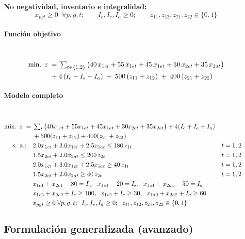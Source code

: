 \textbf{No negatividad, inventario e integralidad:}
\begin{equation}
    x_{pgt} \geq 0 \;\; \forall p,g,t; \qquad I_c, I_e, I_a \geq 0; \qquad z_{11}, z_{12}, z_{21}, z_{22} \in \{0,1\}
\end{equation}

\paragraph{Función objetivo}\mbox{}\\
\begin{align}
\mbox{min. } z \;=\;
& \textstyle\sum_{t\in\{1,2\}} \big(40\,x_{1ct} + 55\,x_{1et} + 45\,x_{1at} + 30\,x_{2ct} + 35\,x_{2at}\big) \notag\\
+\;& 4\,(I_c + I_e + I_a) \;+\; 500\,(z_{11} + z_{12}) \;+\; 400\,(z_{21} + z_{22})
\end{align}

\paragraph{Modelo completo}\mbox{}\\
\begin{align}
\mbox{min. } z \;=\;
& \textstyle\sum_{t}\big(40 x_{1ct} + 55 x_{1et} + 45 x_{1at} + 30 x_{2ct} + 35 x_{2at}\big) + 4(I_c + I_e + I_a) \notag\\
& + 500(z_{11}+z_{12}) + 400(z_{21}+z_{22}) \notag\\
\mbox{s. a.:}\quad
& 2.0 x_{1ct} + 3.0 x_{1et} + 2.5 x_{1at} \leq 180\,z_{1t} && t=1,2 \notag\\
& 1.5 x_{2ct} + 2.0 x_{2at} \leq 200\,z_{2t} && t=1,2 \notag\\
& 2.0 x_{1ct} + 3.0 x_{1et} + 2.5 x_{1at} \geq 40\,z_{1t} && t=1,2 \notag\\
& 1.5 x_{2ct} + 2.0 x_{2at} \geq 40\,z_{2t} && t=1,2 \notag\\
& x_{1c1} + x_{2c1} - 80 = I_c,\;\; x_{1e1} - 20 = I_e,\;\; x_{1a1} + x_{2a1} - 50 = I_a \notag\\
& x_{1c2} + x_{2c2} + I_c \geq 100,\;\; x_{1e2} + I_e \geq 30,\;\; x_{1a2} + x_{2a2} + I_a \geq 60 \notag\\
& x_{pgt} \geq 0 \;\forall p,g,t; \;\; I_c,I_e,I_a \geq 0; \;\; z_{11},z_{12},z_{21},z_{22}\in\{0,1\} \notag
\end{align}

\subsection{Formulación generalizada (avanzado)}

